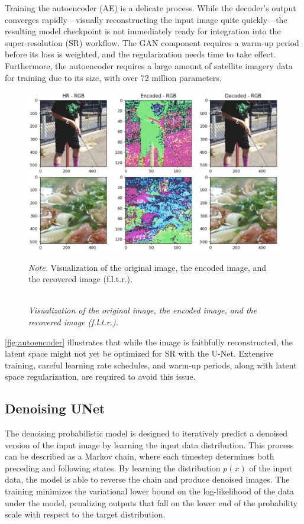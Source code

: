Training the autoencoder (AE) is a delicate process. While the decoder's output converges rapidly—visually reconstructing the input image quite quickly—the resulting model checkpoint is not immediately ready for integration into the super-resolution (SR) workflow. The GAN component requires a warm-up period before its loss is weighted, and the regularization needs time to take effect. Furthermore, the autoencoder requires a large amount of satellite imagery data for training due to its size, with over 72 million parameters.

\begin{figure}[H]
    \caption{\doublespacing \\ \textit{Visualization of the original image, the encoded image, and the recovered image (f.l.t.r.).}} 
    \centering
    \includegraphics[width=1\linewidth]{images/autoencoder.png}
    \begin{justify}
        \textit{Note.} Visualization of the original image, the encoded image, and the recovered image (f.l.t.r.).
    \end{justify}                    
    \label{fig:autoencoder}
\end{figure}


\autoref{fig:autoencoder} illustrates that while the image is faithfully reconstructed, the latent space might not yet be optimized for SR with the U-Net. Extensive training, careful learning rate schedules, and warm-up periods, along with latent space regularization, are required to avoid this issue.

\subsection{Denoising UNet}
The denoising probabilistic model is designed to iteratively predict a denoised version of the input image by learning the input data distribution. This process can be described as a Markov chain, where each timestep determines both preceding and following states. By learning the distribution $p(x)$ of the input data, the model is able to reverse the chain and produce denoised images. The training minimizes the variational lower bound on the log-likelihood of the data under the model, penalizing outputs that fall on the lower end of the probability scale with respect to the target distribution.

